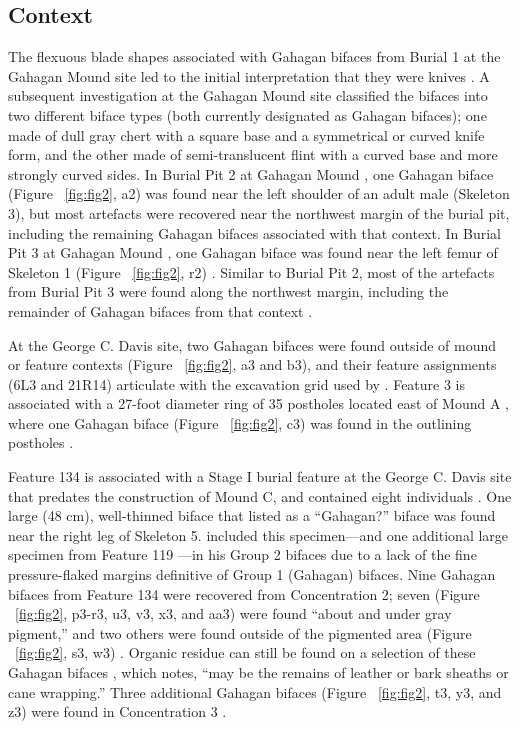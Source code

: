 \documentclass[review]{elsarticle}
\begin{document}
\subsection*{Context}

The flexuous blade shapes associated with Gahagan bifaces from Burial 1 at the Gahagan Mound site led to the initial interpretation that they were knives \citep[Figures 18-21]{RN2740}. A subsequent investigation at the Gahagan Mound site \citep{RN5274} classified the bifaces into two different biface types (both currently designated as Gahagan bifaces); one made of dull gray chert with a square base and a symmetrical or curved knife form, and the other made of semi-translucent flint with a curved base and more strongly curved sides. In Burial Pit 2 at Gahagan Mound \citep[Plate 21]{RN5274}, one Gahagan biface (Figure ~\ref{fig:fig2}, a2) \citep[Plate 27, No. 1, 3]{RN5274} was found near the left shoulder of an adult male (Skeleton 3), but most artefacts were recovered near the northwest margin of the burial pit, including the remaining Gahagan bifaces associated with that context. In Burial Pit 3 at Gahagan Mound \citep[Plate 23, 1]{RN5274}, one Gahagan biface was found near the left femur of Skeleton 1 (Figure ~\ref{fig:fig2}, r2) \citep[Plate 27, No. 1, 2]{RN5274}. Similar to Burial Pit 2, most of the artefacts from Burial Pit 3 were found along the northwest margin, including the remainder of Gahagan bifaces from that context \citep{RN5274}.

At the George C. Davis site, two Gahagan bifaces were found outside of mound or feature contexts (Figure ~\ref{fig:fig2}, a3 and b3), and their feature assignments (6L3 and 21R14) articulate with the excavation grid used by \cite{RN800}. Feature 3 is associated with a 27-foot diameter ring of 35 postholes located east of Mound A \citep[Figure 4]{RN800}, where one Gahagan biface (Figure ~\ref{fig:fig2}, c3) was found in the outlining postholes \cite{RN800}.

Feature 134 is associated with a Stage I burial feature at the George C. Davis site that predates the construction of Mound C, and contained eight individuals \citep{RN808,RN5050}. One large (48 cm), well-thinned biface that \citet[22]{RN808} listed as a “Gahagan?” biface was found near the right leg of Skeleton 5.  \citet[Figure 19x]{RN3684} included this specimen---and one additional large specimen from Feature 119 \citep[Figure 19w]{RN3684}---in his Group 2 bifaces due to a lack of the fine pressure-flaked margins definitive of Group 1 (Gahagan) bifaces. Nine Gahagan bifaces from Feature 134 were recovered from Concentration 2; seven (Figure ~\ref{fig:fig2}, p3-r3, u3, v3, x3, and aa3) were found “about and under gray pigment,” and two others were found outside of the pigmented area (Figure ~\ref{fig:fig2}, s3, w3) \citep[21-23 and Figure 12]{RN808}. Organic residue can still be found on a selection of these Gahagan bifaces \citep[Figure 2]{RN11783}, which \citet[228]{RN3684} notes, “may be the remains of leather or bark sheaths or cane wrapping.” Three additional Gahagan bifaces (Figure ~\ref{fig:fig2}, t3, y3, and z3) were found in Concentration 3 \citep[21-22 and Figure 12]{RN808}.
\end{document}

